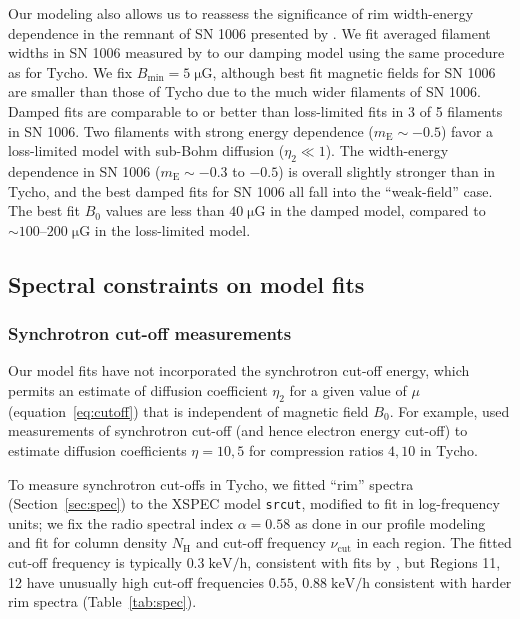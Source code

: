 \documentclass[iop, apj, numberedappendix]{emulateapj}
\newcommand*{\mt}{\mathrm}
\newcommand*{\unit}[1]{\;\mt{#1}}  %
\newcommand*{\abt}{\mathord{\sim}} %
\newcommand*{\mE}{m_\mt{E}}
\newcommand*{\Bmin}{B_{\mt{min}}}
\newcommand*{\muG}{\unit{\mu G}}
\begin{document}
Our modeling also allows us to reassess the significance of rim width-energy
dependence in the remnant of SN 1006 presented by .  We
fit averaged filament widths in SN 1006 measured by  to
our damping model using the same procedure as for Tycho.  We fix $\Bmin = 5
\muG$, although best fit magnetic fields for SN 1006 are smaller than those of
Tycho due to the much wider filaments of SN 1006.
Damped fits are comparable to or better than loss-limited fits in 3 of 5
filaments in SN 1006.  Two filaments with strong energy dependence ($\mE \sim
-0.5$) favor a loss-limited model with sub-Bohm diffusion ($\eta_2 \ll 1$).
The width-energy dependence in SN 1006 ($\mE \sim -0.3$ to $-0.5$) is overall
slightly stronger than in Tycho, and the best damped fits for SN 1006 all fall
into the ``weak-field'' case.  The best fit $B_0$ values are less than $40
\muG$ in the damped model, compared to $\abt 100$--$200 \muG$ in the
loss-limited model.

\subsection{Spectral constraints on model fits}

\subsubsection{Synchrotron cut-off measurements}

Our model fits have not incorporated the synchrotron cut-off energy, which
permits an estimate of diffusion coefficient $\eta_2$ for a given value of
$\mu$ (equation~\eqref{eq:cutoff}) that is independent of magnetic field
$B_0$.  For example, \citet{parizot2006} used measurements of synchrotron
cut-off (and hence electron energy cut-off) to estimate diffusion coefficients
$\eta = 10, 5$ for compression ratios $4, 10$ in Tycho.

To measure synchrotron cut-offs in Tycho, we fitted ``rim'' spectra
(Section~\ref{sec:spec}) to the XSPEC model \texttt{srcut}, modified to fit in
log-frequency units; we fix the radio spectral index $\alpha = 0.58$
\citep{sun2011} as done in our profile modeling and fit for column density
$N_{\mt{H}}$ and cut-off frequency $\nu_{\mt{cut}}$ in each region.  The
fitted cut-off frequency is typically $0.3 \unit{keV/h}$, consistent with fits
by \citet{hwang2002}, but Regions 11, 12 have unusually high cut-off
frequencies $0.55$, $0.88 \unit{keV/h}$ consistent with harder rim spectra
(Table~\ref{tab:spec}).
\end{document}
